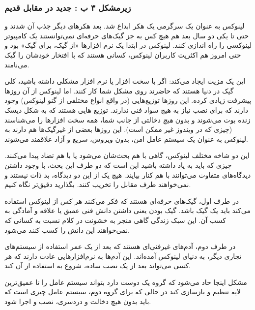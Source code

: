 \subsubsection*{زیرمشکل ۳ ب : جدید در مقابل قدیم}
\begin{mybox}
لینوکس به عنوان یک سرگرمی یک هکر ابداع شد. بعد هکرهای دیگر جذب آن شدند و حتی تا یکی دو سال بعد هم هیچ کس به جز گیک‌های حرفه‌ای نمی‌توانستند یک کامپیوتر لینوکسی را راه اندازی کنند. لینوکس در ابتدا یک نرم افزارها «از گیک، برای گیک» بود و حتی امروز هم اکثریت کاربران لینوکس، کسانی هستند که با افتخار خودشان را گیک می‌نامند.
\end{mybox}
این یک مزیت ایجاد می‌کند: اگر با سخت افزار یا نرم افزار مشکلی داشته باشید، کلی گیک در دنیا هستند که حاضرند روی مشکل شما کار کنند.
اما لینوکس از آن روزها پیشرفت زیادی کرده. این روزها توزیع‌هایی (در واقع انواع مختلفی از گنو لینوکس) وجود دارند که برای نصب نیاز به هیچ سواد فنی ندارند. توزیع هایی هستند که به شکل دیسک زنده بوت می‌شوند و بدون
\emph{هیچ}
دخالتی از جانب شما، همه سخت افزارها را می‌شناسند (چیزی که در ویندوز غیر ممکن است). این روزها بعضی از غیرگیک‌ها هم دارند به لینوکس به عنوان یک سیستم عامل امن، بدون ویروس، سریع و آزاد علاقمند می‌شوند.

این دو شاخه مختلف لینوکس، گاهی با هم بحث‌شان می‌شود یا با هم تضاد پیدا می‌کنند. چیزی که باید به یاد داشته باشید این است که دو طرف این بحث،‌ با وجود داشتن دیدگاه‌های متفاوت می‌توانند با هم کنار بیایند. هیچ یک از این دو دیدگاه، بد ذات نیستند و نمی‌خواهند طرف مقابل را تخریب کنند. بگذارید دقیق‌تر نگاه کنیم.

در طرف اول، گیک‌های حرفه‌ای هستند که فکر می‌کنند هر کس از لینوکس استفاده می‌کند باید یک گیک باشد. گیک بودن یعنی داشتن دانش فنی عمیق یا علاقه و آمادگی به کسب آن. این سبک زندگی گاهی منجر به خشونت در کلام نسبت به کسانی که نمی‌خواهند این دانش را کسب کنند می‌شود.

در طرف دوم،‌ آدم‌های غیرفنی‌ای هستند که بعد از یک عمر استفاده از سیستم‌های تجاری دیگر، به دنیای لینوکس آمده‌اند. این آدم‌ها به نرم‌افزارهایی عادت دارند که هر کسی می‌تواند بعد از یک نصب ساده، شروع به استفاده از آن کند.

مشکل اینجا حاد می‌شود که گروه یک دوست دارد بتواند سیستم عامل را تا عمیق‌ترین لایه تنظیم و بازسازی کند در حالی که برای گروه دوم، سیستم عامل چیزی است که باید بدون هیچ دخالت و دردسری، نصب و اجرا شود.

